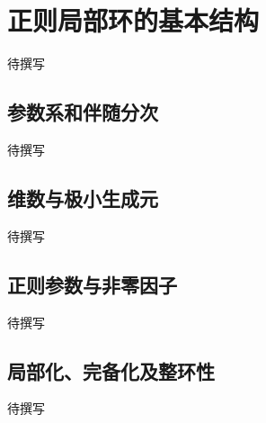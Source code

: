 
% 
% 

\section{正则局部环的基本结构}
\label{g5:sec:0901}

待撰写

\subsection{参数系和伴随分次}
\label{g5:subsec:0901:01}
待撰写

\subsection{维数与极小生成元}
\label{g5:subsec:0901:02}
待撰写

\subsection{正则参数与非零因子}
\label{g5:subsec:0901:03}
待撰写

\subsection{局部化、完备化及整环性}
\label{g5:subsec:0901:04}
待撰写
